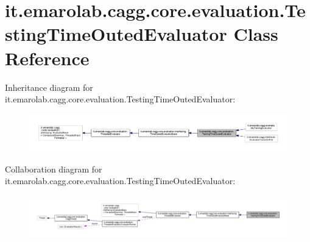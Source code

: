 \hypertarget{classit_1_1emarolab_1_1cagg_1_1core_1_1evaluation_1_1TestingTimeOutedEvaluator}{\section{it.\-emarolab.\-cagg.\-core.\-evaluation.\-Testing\-Time\-Outed\-Evaluator Class Reference}
\label{classit_1_1emarolab_1_1cagg_1_1core_1_1evaluation_1_1TestingTimeOutedEvaluator}
}


Inheritance diagram for it.\-emarolab.\-cagg.\-core.\-evaluation.\-Testing\-Time\-Outed\-Evaluator\-:\nopagebreak
\begin{figure}[H]
\begin{center}
\leavevmode
\includegraphics[width=350pt]{classit_1_1emarolab_1_1cagg_1_1core_1_1evaluation_1_1TestingTimeOutedEvaluator__inherit__graph}
\end{center}
\end{figure}


Collaboration diagram for it.\-emarolab.\-cagg.\-core.\-evaluation.\-Testing\-Time\-Outed\-Evaluator\-:\nopagebreak
\begin{figure}[H]
\begin{center}
\leavevmode
\includegraphics[width=350pt]{classit_1_1emarolab_1_1cagg_1_1core_1_1evaluation_1_1TestingTimeOutedEvaluator__coll__graph}
\end{center}
\end{figure}
